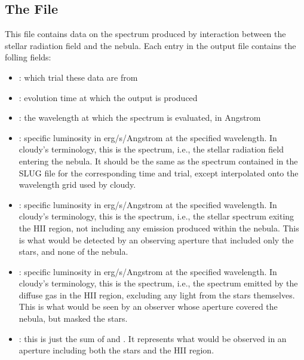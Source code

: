 \documentclass[letterpaper,10pt,english]{sphinxmanual}
\begin{document}
\subsection{The  File}
\label{\detokenize{cloudy:the-integrated-cloudyspec-file}}\label{\detokenize{cloudy:sssec-int-cloudyspec-file}}
This file contains data on the spectrum produced by interaction
between the stellar radiation field and the nebula. Each entry in the
output file contains the folling fields:
\begin{itemize}
\item {} 
: which trial these data are from

\item {} 
: evolution time at which the output is produced

\item {} 
: the wavelength at which the spectrum is evaluated,
in Angstrom

\item {} 
: specific luminosity in erg/s/Angstrom at the specified
wavelength. In cloudy’s terminology, this is the 
spectrum, i.e., the stellar radiation field entering the nebula. It
should be the same as the spectrum contained in the SLUG
 file for the corresponding time and trial,
except interpolated onto the wavelength grid used by cloudy.

\item {} 
:  specific luminosity in erg/s/Angstrom at the specified
wavelength. In cloudy’s terminology, this is the 
spectrum, i.e., the stellar spectrum exiting the HII region, not
including any emission produced within the nebula. This is what
would be detected by an observing aperture that included only the
stars, and none of the nebula.

\item {} 
:  specific luminosity in erg/s/Angstrom at the specified
wavelength. In cloudy’s terminology, this is the 
spectrum, i.e., the spectrum emitted by the diffuse gas in the HII
region, excluding any light from the stars themselves. This is what
would be seen by an observer whose aperture covered the nebula, but
masked the stars.

\item {} 
: this is just the sum of
 and . It represents what would be
observed in an aperture including both the stars and the HII
region.

\end{itemize}
\end{document}
